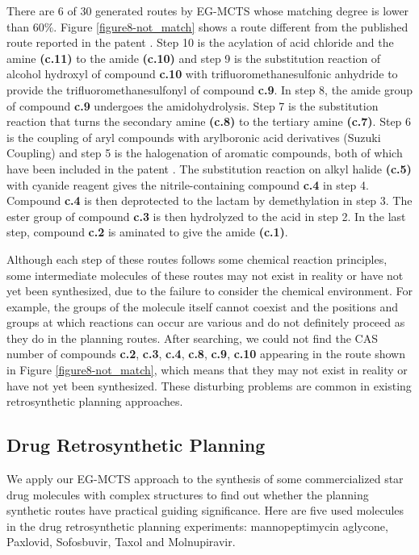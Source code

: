 \documentclass[sn-mathphys,Numbered]{sn-jnl}
\begin{document}
There are $6$ of $30$ generated routes by EG-MCTS whose matching degree is lower than $60\%$. Figure \ref{figure8-not_match} shows a route different from the published route reported in the patent \citep{paten-notsame}.
Step 10 is the acylation of acid chloride and the amine \textbf{(c.11)} to the amide \textbf{(c.10)} and step 9 is the substitution reaction of alcohol hydroxyl of compound \textbf{c.10} with trifluoromethanesulfonic anhydride to provide the trifluoromethanesulfonyl of compound \textbf{c.9}. 
In step 8, the amide group of compound \textbf{c.9} undergoes the amidohydrolysis. 
Step 7 is the substitution reaction that turns the secondary amine \textbf{(c.8)} to the tertiary amine \textbf{(c.7)}.
Step 6 is the coupling of aryl compounds with arylboronic acid derivatives (Suzuki Coupling) and step 5 is the halogenation of aromatic compounds, both of which have been included in the patent \citep{paten2}. 
The substitution reaction on alkyl halide \textbf{(c.5)} with cyanide reagent gives the nitrile-containing compound \textbf{c.4} in step 4. 
Compound \textbf{c.4} is then deprotected to the lactam by demethylation in step 3. 
The ester group of compound \textbf{c.3} is then hydrolyzed to the acid in step 2. 
In the last step, compound \textbf{c.2} is aminated to give the amide \textbf{(c.1)}.

Although each step of these routes follows some chemical reaction principles, some intermediate molecules of these routes may not exist in reality or have not yet been synthesized, due to the failure to consider the chemical environment. For example, the groups of the molecule itself cannot coexist and the positions and groups at which reactions can occur are various and do not definitely proceed as they do in the planning routes. After searching, we could not find the CAS number of compounds \textbf{c.2}, \textbf{c.3}, \textbf{c.4}, \textbf{c.8}, \textbf{c.9}, \textbf{c.10} appearing in the route shown in Figure \ref{figure8-not_match}, which means that they may not exist in reality or have not yet been synthesized. These disturbing problems are common in existing retrosynthetic planning approaches.



\subsection{Drug Retrosynthetic Planning}

We apply our EG-MCTS approach to the synthesis of some commercialized star drug molecules with complex structures to find out whether the planning synthetic routes have practical guiding significance. Here are five used molecules in the drug retrosynthetic planning experiments: mannopeptimycin aglycone, Paxlovid, Sofosbuvir, Taxol and Molnupiravir.
\end{document}
